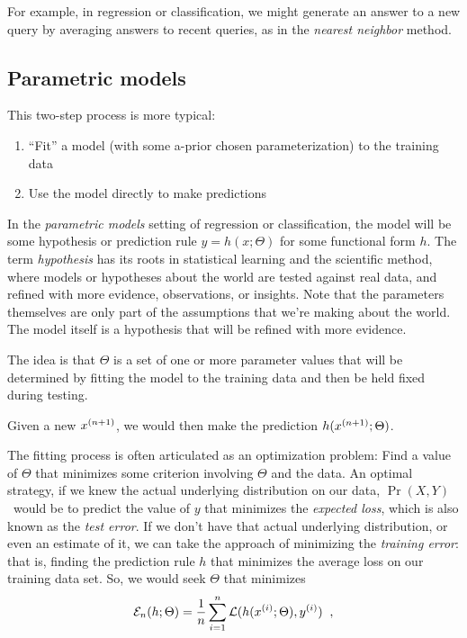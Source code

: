 For example, in regression or classification, we might generate an answer to a new query by averaging answers to recent queries, as in the {\em nearest neighbor} method.


\subsection{Parametric models}

This two-step process is more typical:
\begin{enumerate}
  \item ``Fit'' a model (with some a-prior chosen parameterization) to the training data
  \item Use the model directly to make predictions
\end{enumerate}

In the {\em parametric models} setting of regression or classification, the
model will be some hypothesis or prediction rule $y = h(x ; \Theta)$ for some functional form $h$. The term {\em hypothesis} has its roots in statistical learning and the scientific method, where models or hypotheses about the world are tested against real data, and refined with more evidence, observations, or insights. Note that the parameters themselves are only part of the assumptions that we're making about the world. The model itself is a hypothesis that will be refined with more evidence. 

The idea is that $\Theta$ is a set
of one or more parameter values that will be determined by fitting the
model to the training data and then be held fixed during testing.  

Given a new $x^{(n+1)}$, we would then make the prediction $h(x^{(n+1)};
  \Theta)$.  

The fitting process is often articulated as an optimization problem:
Find a value of $\Theta$ that minimizes some criterion involving
$\Theta$ and the data. An optimal strategy, if we knew the actual underlying distribution on
our data, $\Pr(X,Y)$\  would be to predict the value of $y$ that	%
minimizes the {\em expected loss}, which is also known as the {\em
    test error}.  If we don't have that actual underlying distribution, or
even an estimate of it, we can take the approach of minimizing the
  {\em training error}: that is, finding the prediction rule $h$ that
minimizes the average loss on our training data set.  So, we would
seek $\Theta$ that minimizes
\begin{eqnarray*}
  \mathcal{E}_n(h; \Theta) =  \frac{1}{n}\sum_{i = 1}^n
  \mathcal{L}(h(x^{(i)};\Theta), y^{(i)})\;\;,
\end{eqnarray*}

